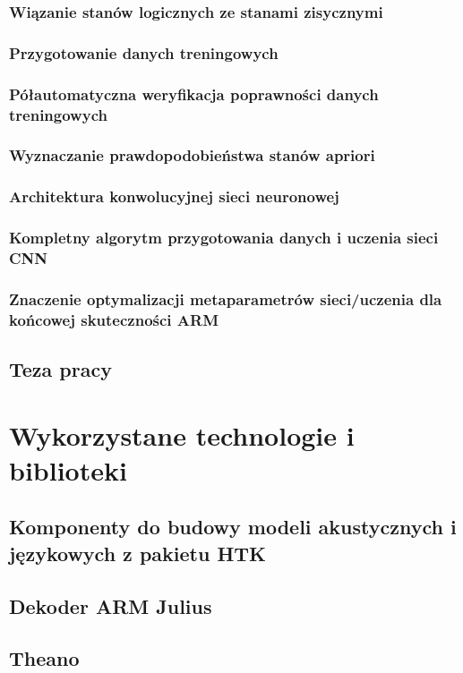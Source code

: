 \documentclass[11pt]{article}
\begin{document}
		\subsubsection{ Wiązanie stanów logicznych ze stanami zisycznymi }
		\subsubsection{ Przygotowanie danych treningowych }
		\subsubsection{ Półautomatyczna weryfikacja poprawności danych treningowych }
		\subsubsection{ Wyznaczanie prawdopodobieństwa stanów apriori }
		\subsubsection{ Architektura konwolucyjnej sieci neuronowej }
		\subsubsection{ Kompletny algorytm przygotowania danych i uczenia sieci CNN }
		\subsubsection{ Znaczenie optymalizacji metaparametrów sieci/uczenia dla końcowej skuteczności ARM }	
	\subsection{ Teza pracy }

\section{ Wykorzystane technologie i biblioteki }
	\subsection{ Komponenty do budowy modeli akustycznych i językowych z pakietu HTK }
	\subsection{ Dekoder ARM Julius }
	\subsection{ Theano }
\end{document}
